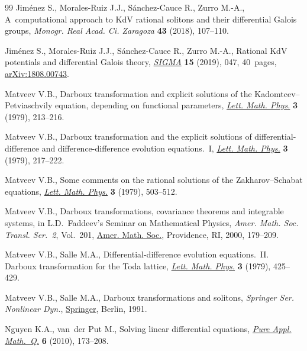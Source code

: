 \documentclass[pdftex]{sigma}%
\numberwithin{equation}{section}
\begin{document}
\begin{thebibliography}{99}
Jim\'enez S., Morales-Ruiz J.J., S\'anchez-Cauce R., Zurro M.-A., A~computational approach to {K}d{V} rational solitons and their differential
 {G}alois groups, \textit{Monogr. Real Acad. Ci. Zaragoza} \textbf{43} (2018),
 107--110.

Jim\'enez S., Morales-Ruiz J.J., S\'anchez-Cauce R., Zurro M.-A., Rational
 {K}d{V} potentials and differential {G}alois theory, \href{https://doi.org/10.3842/SIGMA.2019.047}{\textit{SIGMA}}
 \textbf{15} (2019), 047, 40~pages, \href{https://arxiv.org/abs/1808.00743}{arXiv:1808.00743}.

Matveev V.B., Darboux transformation and explicit solutions of the
 {K}adomtcev--{P}etviaschvily equation, depending on functional parameters,
 \href{https://doi.org/10.1007/BF00405295}{\textit{Lett. Math. Phys.}} \textbf{3} (1979), 213--216.

Matveev V.B., Darboux transformation and the explicit solutions of
 differential-difference and difference-difference evolution equations.~{I},
 \href{https://doi.org/10.1007/BF00405296}{\textit{Lett. Math. Phys.}} \textbf{3} (1979), 217--222.

Matveev V.B., Some comments on the rational solutions of the
 {Z}akharov--{S}chabat equations, \href{https://doi.org/10.1007/BF00401932}{\textit{Lett. Math. Phys.}} \textbf{3}
 (1979), 503--512.

Matveev V.B., Darboux transformations, covariance theorems and integrable
 systems, in L.{D}.~{F}addeev's {S}eminar on {M}athematical {P}hysics,
 \textit{Amer. Math. Soc. Transl. Ser.~2}, Vol.~201, \href{https://doi.org/10.1090/trans2/201/11}{Amer. Math. Soc.},
 Providence, RI, 2000, 179--209.

Matveev V.B., Salle M.A., Differential-difference evolution equations.~{II}.
 {D}arboux transformation for the {T}oda lattice, \href{https://doi.org/10.1007/BF00397217}{\textit{Lett. Math. Phys.}}
 \textbf{3} (1979), 425--429.

Matveev V.B., Salle M.A., Darboux transformations and solitons, \textit{Springer Ser.
 Nonlinear Dyn.}, \href{https://doi.org/10.1007/978-3-662-00922-2}{Springer}, Berlin, 1991.

Nguyen K.A., van~der Put M., Solving linear differential equations,
 \href{https://doi.org/10.4310/PAMQ.2010.v6.n1.a5}{\textit{Pure Appl. Math.~Q.}} \textbf{6} (2010), 173--208.


\end{thebibliography}
\end{document}
